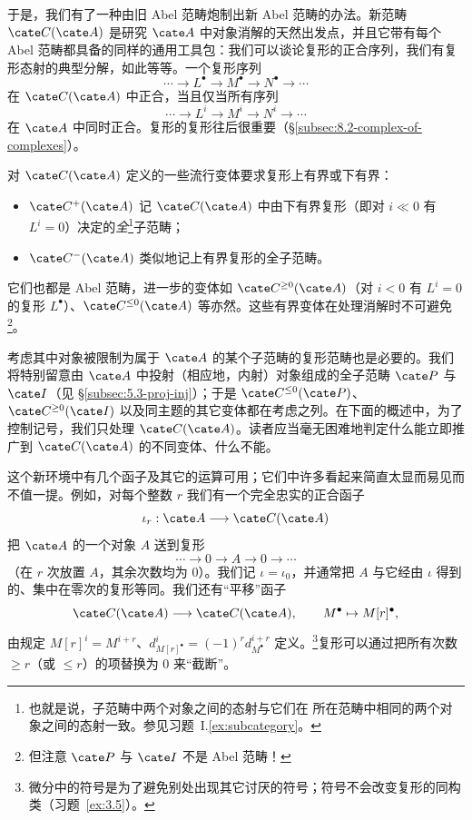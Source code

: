 于是，我们有了一种由旧 Abel 范畴炮制出新 Abel 范畴的办法。新范畴 $\cate C(\cate A)$ 是研究 $\cate A$ 中对象消解的天然出发点，并且它带有每个 Abel 范畴都具备的同样的通用工具包：我们可以谈论复形的正合序列，我们有复形态射的典型分解，如此等等。一个复形序列
\[
\cdots \longrightarrow L^\bullet \longrightarrow M^\bullet \longrightarrow N^\bullet \longrightarrow \cdots
\]
在 $\cate C(\cate A)$ 中正合，当且仅当所有序列
\[
\cdots \longrightarrow L^i \longrightarrow M^i \longrightarrow N^i \longrightarrow \cdots
\]
在 $\cate A$ 中同时正合。复形的复形往后很重要（\S\ref{subsec:8.2-complex-of-complexes}）。

对 $\cate C(\cate A)$ 定义的一些流行变体要求复形上有界或下有界：
\begin{itemize}
\item $\cate C^+(\cate A)$ 记 $\cate C(\cate A)$ 中由下有界复形（即对 $i\ll 0$ 有 $L^i=0$）决定的\emph{全}\footnote{也就是说，子范畴中两个对象之间的态射与它们在 所在范畴中相同的两个对象之间的态射一致。参见习题~I.\ref{ex:subcategory}。}子范畴；
\item $\cate C^-(\cate A)$ 类似地记上有界复形的全子范畴。
\end{itemize}
它们也都是 Abel 范畴，进一步的变体如 $\cate C^{\ge 0}(\cate A)$（对 $i<0$ 有 $L^i=0$ 的复形 $L^\bullet$）、$\cate C^{\le 0}(\cate A)$ 等亦然。这些有界变体在处理消解时不可避免\footnote{但注意 $\cate P$ 与 $\cate I$ 不是 Abel 范畴！}。

考虑其中对象被限制为属于 $\cate A$ 的某个子范畴的复形范畴也是必要的。我们将特别留意由 $\cate A$ 中投射（相应地，内射）对象组成的全子范畴 $\cate P$ 与 $\cate I$（见 \S\ref{subsec:5.3-proj-inj}）；于是 $\cate C^{\le 0}(\cate P)$、$\cate C^{\ge 0}(\cate I)$ 以及同主题的其它变体都在考虑之列。在下面的概述中，为了控制记号，我们只处理 $\cate C(\cate A)$。读者应当毫无困难地判定什么能立即推广到 $\cate C(\cate A)$ 的不同变体、什么不能。

这个新环境中有几个函子及其它的运算可用；它们中许多看起来简直太显而易见而不值一提。例如，对每个整数 $r$ 我们有一个完全忠实的正合函子
\[
\iota_r:\cate A\longrightarrow \cate C(\cate A)
\]
把 $\cate A$ 的一个对象 $A$ 送到复形
\[
\cdots \longrightarrow 0 \longrightarrow A \longrightarrow 0 \longrightarrow \cdots
\]
（在 $r$ 次放置 $A$，其余次数均为 $0$）。我们记 $\iota=\iota_0$，并通常把 $A$ 与它经由 $\iota$ 得到的、集中在零次的复形等同。我们还有“平移”函子
\[
\cate C(\cate A)\longrightarrow \cate C(\cate A),\qquad M^\bullet\mapsto M[r]^\bullet,
\]
由规定 $M[r]^i=M^{i+r}$、$d_{M[r]^\bullet}^i=(-1)^r d_{M^\bullet}^{i+r}$ 定义。\footnote{微分中的符号是为了避免别处出现其它讨厌的符号；符号不会改变复形的同构类（习题~\ref{ex:3.5}）。}复形可以通过把所有次数 $\ge r$（或 $\le r$）的项替换为 $0$ 来“截断”。

